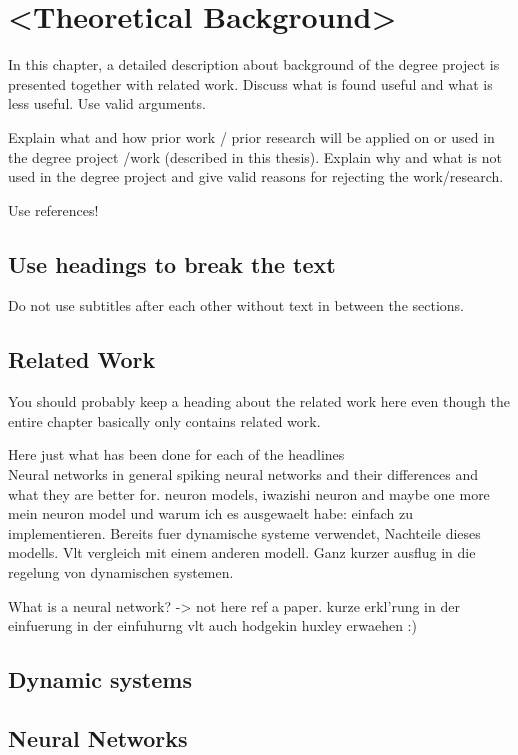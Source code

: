 \chapter{<Theoretical Background>}
In this chapter, a detailed description about background of the degree project is presented together with related work. Discuss what is found useful and what is less useful. Use valid arguments.

Explain what and how prior work / prior research will be applied on or used in the degree project /work (described in this thesis). Explain why and what is not used in the degree project and give valid reasons for rejecting the work/research.

Use references!

\section{Use headings to break the text}
Do not use subtitles after each other without text in between the sections.

\section{Related Work}
You should probably keep a heading about the related work here even though the entire chapter basically only contains related work.

Here just what has been done for each of the headlines\\


Neural networks in general
spiking neural networks and their differences and what they are better for.
neuron models, iwazishi neuron and maybe one more
mein neuron model und warum ich es ausgewaelt habe: einfach zu implementieren. Bereits fuer dynamische systeme verwendet,
Nachteile dieses modells.
Vlt vergleich mit einem anderen modell.
Ganz kurzer ausflug in die regelung von dynamischen systemen.


What is a neural network? -> not here ref a paper. kurze erkl'rung in der einfuerung
in der einfuhurng vlt auch hodgekin huxley erwaehen :)
\section{Dynamic systems}

\section{Neural Networks}

